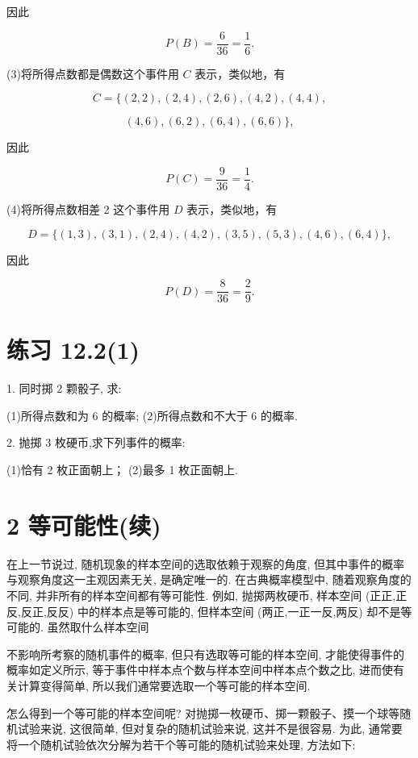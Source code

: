 \documentclass[10pt]{article}
\begin{document}
因此

\[
P\left( B\right)  = \frac{6}{36} = \frac{1}{6}.
\]

(3)将所得点数都是偶数这个事件用 \(C\) 表示，类似地，有

\[
C = \{ \left( {2,2}\right) ,\left( {2,4}\right) ,\left( {2,6}\right) ,\left( {4,2}\right) ,\left( {4,4}\right) ,
\]

\[
\left( {4,6}\right) ,\left( {6,2}\right) ,\left( {6,4}\right) ,\left( {6,6}\right) \} ,
\]

因此

\[
P\left( C\right)  = \frac{9}{36} = \frac{1}{4}.
\]

(4)将所得点数相差 2 这个事件用 \(D\) 表示，类似地，有

\[
D = \{ \left( {1,3}\right) ,\left( {3,1}\right) ,\left( {2,4}\right) ,\left( {4,2}\right) ,\left( {3,5}\right) ,\left( {5,3}\right) ,\left( {4,6}\right) ,\left( {6,4}\right) \} ,
\]

因此

\[
P\left( D\right)  = \frac{8}{36} = \frac{2}{9}.
\]

\section*{练习 12.2(1)}

1. 同时掷 2 颗骰子, 求:

(1)所得点数和为 6 的概率; (2)所得点数和不大于 6 的概率.

2. 抛掷 3 枚硬币,求下列事件的概率:

(1)恰有 2 枚正面朝上； (2)最多 1 枚正面朝上.

\section*{2 等可能性(续)}

在上一节说过, 随机现象的样本空间的选取依赖于观察的角度, 但其中事件的概率与观察角度这一主观因素无关, 是确定唯一的. 在古典概率模型中, 随着观察角度的不同, 并非所有的样本空间都有等可能性. 例如, 抛掷两枚硬币, 样本空间 (正正,正反,反正,反反) 中的样本点是等可能的, 但样本空间 (两正,一正一反,两反) 却不是等可能的. 虽然取什么样本空间



不影响所考察的随机事件的概率, 但只有选取等可能的样本空间, 才能使得事件的概率如定义所示, 等于事件中样本点个数与样本空间中样本点个数之比, 进而使有关计算变得简单, 所以我们通常要选取一个等可能的样本空间.

怎么得到一个等可能的样本空间呢? 对抛掷一枚硬币、掷一颗骰子、摸一个球等随机试验来说, 这很简单, 但对复杂的随机试验来说, 这并不是很容易. 为此, 通常要将一个随机试验依次分解为若干个等可能的随机试验来处理, 方法如下:
\end{document}
